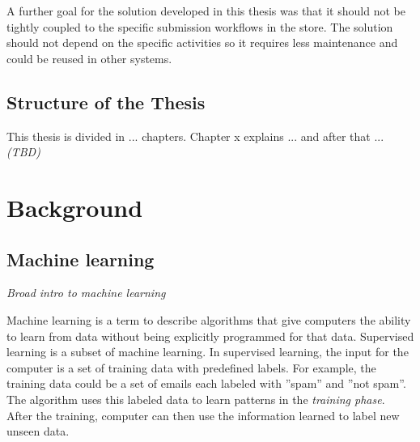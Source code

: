 \documentclass[english,12pt,a4paper,pdftex,sci,utf8]{aaltothesis}
\newcommand{\nyi}[1]{\colorbox{nyibg}{\textcolor{nyitext}{\emph{#1}}}}
\begin{document}
A further goal for the solution developed in this thesis was that it should not be tightly coupled to the 
specific submission workflows in the store. The solution should not depend on the specific activities so
it requires less maintenance and could be reused in other systems.

\subsection{Structure of the Thesis}
This thesis is divided in ... chapters. Chapter x explains ... and after that ... 
\nyi{(TBD)}


\clearpage
\section{Background}
\label{sec:background}

\subsection{Machine learning}

\nyi{Broad intro to machine learning}

Machine learning is a term to describe algorithms that give computers the ability to learn from data without being explicitly programmed for that data. Supervised learning is a subset of machine learning. In supervised learning, the input for the computer is a set of training data with predefined labels. For example, the training data could be a set of emails each labeled with ''spam'' and ''not spam''. The algorithm uses this labeled data to learn patterns in the \emph{training phase}. After the training, computer can then use the information learned to label new unseen data.

\end{document}

